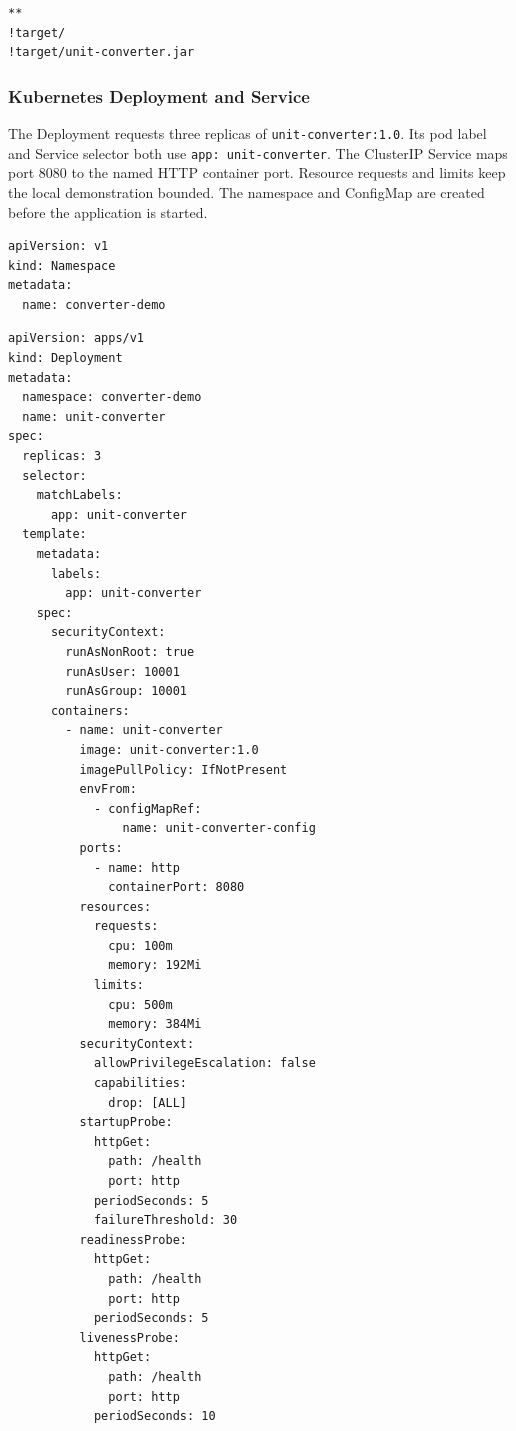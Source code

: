 \documentclass[12pt,a4paper]{article}
\begin{document}
\begin{lstlisting}
**
!target/
!target/unit-converter.jar
\end{lstlisting}

\subsubsection*{Kubernetes Deployment and Service}

The Deployment requests three replicas of \texttt{unit-converter:1.0}. Its pod label and Service selector both use \texttt{app: unit-converter}. The ClusterIP Service maps port 8080 to the named HTTP container port. Resource requests and limits keep the local demonstration bounded. The namespace and ConfigMap are created before the application is started.

\par\medskip{}\noindent\textbf{}\par\smallskip

\begin{lstlisting}
apiVersion: v1
kind: Namespace
metadata:
  name: converter-demo
\end{lstlisting}

\par\medskip{}\noindent\textbf{}\par\smallskip

\begin{lstlisting}
apiVersion: apps/v1
kind: Deployment
metadata:
  namespace: converter-demo
  name: unit-converter
spec:
  replicas: 3
  selector:
    matchLabels:
      app: unit-converter
  template:
    metadata:
      labels:
        app: unit-converter
    spec:
      securityContext:
        runAsNonRoot: true
        runAsUser: 10001
        runAsGroup: 10001
      containers:
        - name: unit-converter
          image: unit-converter:1.0
          imagePullPolicy: IfNotPresent
          envFrom:
            - configMapRef:
                name: unit-converter-config
          ports:
            - name: http
              containerPort: 8080
          resources:
            requests:
              cpu: 100m
              memory: 192Mi
            limits:
              cpu: 500m
              memory: 384Mi
          securityContext:
            allowPrivilegeEscalation: false
            capabilities:
              drop: [ALL]
          startupProbe:
            httpGet:
              path: /health
              port: http
            periodSeconds: 5
            failureThreshold: 30
          readinessProbe:
            httpGet:
              path: /health
              port: http
            periodSeconds: 5
          livenessProbe:
            httpGet:
              path: /health
              port: http
            periodSeconds: 10
\end{lstlisting}
\end{document}
